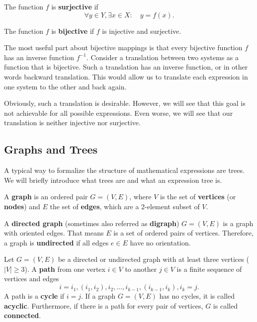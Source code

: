 \begin{definition}
The function $f$ is \textbf{surjective} if
\begin{equation}
\forall y \in Y, \exists x \in X: \quad y = f(x).
\end{equation}
\end{definition}

\begin{definition}[Bijection]
The function $f$ is \textbf{bijective} if $f$ is injective and surjective.
\end{definition}

The most useful part about bijective mappings is that every bijective function $f$ has an inverse function $f^{-1}$. Consider a translation between two systems as a function that is bijective. Such a translation has an inverse function, or in other words backward translation. This would allow us to translate each expression in one system to the other and back again.

Obviously, such a translation is desirable. However, we will see that this goal is not achievable for all possible expressions. Even worse, we will see that our translation is neither injective nor surjective.

\subsection{Graphs and Trees}
A typical way to formalize the structure of mathematical expressions are trees. We will briefly introduce what trees are and what an expression tree is.

\begin{definition}[Graph]
A \textbf{graph} is an ordered pair $G=(V,E)$, where $V$ is the set of \textbf{vertices} (or \textbf{nodes}) and $E$ the set of \textbf{edges}, which are a 2-element subset of $V$.
\end{definition}

\begin{definition}
A \textbf{directed graph} (sometimes also referred as \textbf{digraph}) $G = (V,E)$ is a graph with oriented edges. That means $E$ is a set of ordered pairs of vertices. Therefore, a graph is \textbf{undirected} if all edges $e \in E$ have no orientation.
\end{definition}

\begin{definition}
Let $G = (V,E)$ be a directed or undirected graph with at least three vertices ($|V| \geq 3$). A \textbf{path} from one vertex $i\in V$ to another $j\in V$ is a finite sequence of vertices and edges
\begin{equation}
i = i_1, (i_1, i_2), i_2, \ldots , i_{k-1}, (i_{k-1}, i_k), i_k = j.
\end{equation}
A path is a \textbf{cycle} if $i = j$. If a graph $G = (V,E)$ has no cycles, it is called \textbf{acyclic}. Furthermore, if there is a path for every pair of vertices, $G$ is called \textbf{connected}.
\end{definition}

